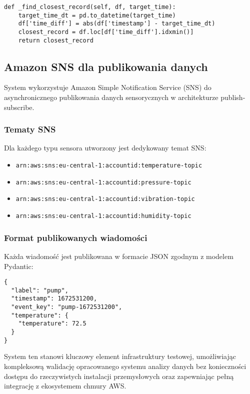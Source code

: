 \begin{verbatim}
def _find_closest_record(self, df, target_time):
    target_time_dt = pd.to_datetime(target_time)
    df['time_diff'] = abs(df['timestamp'] - target_time_dt)
    closest_record = df.loc[df['time_diff'].idxmin()]
    return closest_record
\end{verbatim}

\subsection{Amazon SNS dla publikowania danych}
\label{subsec:amazon_sns}

System wykorzystuje Amazon Simple Notification Service (SNS) do asynchronicznego publikowania danych sensorycznych w architekturze publish-subscribe.

\subsubsection{Tematy SNS}

Dla każdego typu sensora utworzony jest dedykowany temat SNS:

\begin{itemize}
    \item \texttt{arn:aws:sns:eu-central-1:accountid:temperature-topic}
    \item \texttt{arn:aws:sns:eu-central-1:accountid:pressure-topic}
    \item \texttt{arn:aws:sns:eu-central-1:accountid:vibration-topic}
    \item \texttt{arn:aws:sns:eu-central-1:accountid:humidity-topic}
\end{itemize}

\subsubsection{Format publikowanych wiadomości}

Każda wiadomość jest publikowana w formacie JSON zgodnym z modelem Pydantic:

\begin{verbatim}
{
  "label": "pump",
  "timestamp": 1672531200,
  "event_key": "pump-1672531200",
  "temperature": {
    "temperature": 72.5
  }
}
\end{verbatim}









System ten stanowi kluczowy element infrastruktury testowej, umożliwiając kompleksową walidację opracowanego systemu analizy danych bez konieczności dostępu do rzeczywistych instalacji przemysłowych oraz zapewniając pełną integrację z ekosystemem chmury AWS.